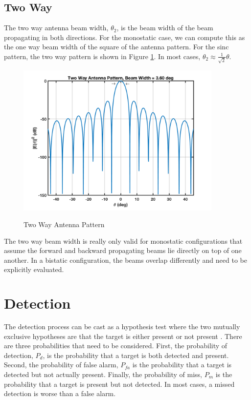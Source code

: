 \subsection{Two Way}
The two way antenna beam width, $\theta_2$, is the beam width of the beam propagating in both directions. For the monostatic case, we can compute this as the one way beam width of the square of the antenna pattern. For the sinc pattern, the two way pattern is shown in Figure \ref{rb_fig:5}. In most cases, $\theta_2 \approx \frac{1}{\sqrt{2}}\theta$.

\begin{figure}[H]
  \begin{center}
\includegraphics[width=4in]{../media/multistatic/sinc_antenna_pattern_two_way.png}
  \end{center}
  \renewcommand{\baselinestretch}{1} \small\normalsize
  \begin{quote}
    \caption[Two Way Antenna Pattern]{Two Way Antenna Pattern\label{rb_fig:5}}
  \end{quote}
\end{figure}
\renewcommand{\baselinestretch}{2} \small\normalsize
The two way beam width is really only valid for monostatic configurations that assume the forward and backward propagating beams lie directly on top of one another. In a bistatic configuration, the beams overlap differently and need to be explicitly evaluated.


\section{Detection}
The detection process can be cast as a hypothesis test where the two mutually exclusive hypotheses are that the target is either present or not present \cite{richards_radar}. There are three probabilities that need to be considered. First, the probability of detection, $P_d$, is the probability that a target is both detected and present. Second, the probability of false alarm, $P_{fa}$ is the probability that a target is detected but not actually present. Finally, the probability of miss, $P_m$ is the probability that a target is present but not detected. In most cases, a missed detection is worse than a false alarm.

